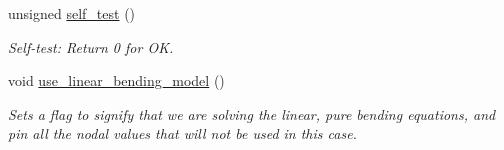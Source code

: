 \begin{DoxyCompactItemize}
unsigned \hyperlink{classoomph_1_1AxisymFoepplvonKarmanEquations_a2ececacf1a7dd89188a4a20e5abbb7c0}{self\+\_\+test} ()
\begin{DoxyCompactList}\small\item\em Self-\/test\+: Return 0 for OK. \end{DoxyCompactList}\item 
void \hyperlink{classoomph_1_1AxisymFoepplvonKarmanEquations_abddb3d7358a6039420bf6ed58e7a5547}{use\+\_\+linear\+\_\+bending\+\_\+model} ()
\begin{DoxyCompactList}\small\item\em Sets a flag to signify that we are solving the linear, pure bending equations, and pin all the nodal values that will not be used in this case. \end{DoxyCompactList}\end{DoxyCompactItemize}
